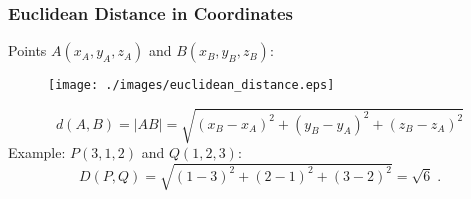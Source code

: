 \begin{frame}[label=current]
 \frametitle{Euclidean Distance in Coordinates}

   Points $A(x_A,y_A,z_A)$ and $B(x_B,y_B,z_B)$:
\begin{figure}[h]
  \texttt{[image: ./images/euclidean\_distance.eps]}
\end{figure}
%
$$d(A,B) = |AB| = \sqrt{(x_B-x_A)^2+(y_B-y_A)^2+(z_B-z_A)^2}$$
%
Example: $P(3,1,2)$ and $Q(1,2,3)$:\pause
%
$$D(P,Q) = \sqrt{(1-3)^2+(2-1)^2+(3-2)^2} = \sqrt{6}\; .$$

\end{frame}